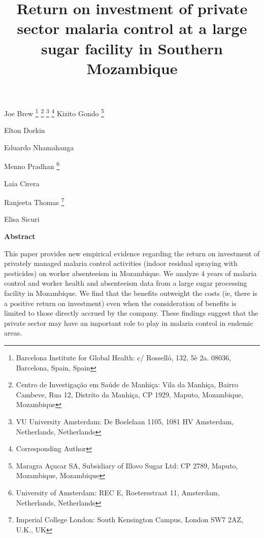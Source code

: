 \documentclass[]{article}
\title{Return on investment of private sector malaria control at a large sugar
facility in Southern Mozambique}
\author{}
\date{}
\let\rmarkdownfootnote\footnote%
\def\footnote{\protect\rmarkdownfootnote}
\newcommand{\footremember}[2]{%
    \footnote{#2}
    \newcounter{#1}
    \setcounter{#1}{\value{footnote}}%
}
\newcommand{\footrecall}[1]{%
    \footnotemark[\value{#1}]%
}
\begin{document}
\maketitle

\begin{center}
\begin{large}

Joe Brew\footremember{isglobal}{Barcelona Institute for Global Health: c/ Rosselló, 132, 5è 2a. 08036, Barcelona, Spain, Spain}\footremember{cism}{Centro de Investigação em Saúde de Manhiça: Vila da Manhiça, Bairro Cambeve, Rua 12, Distrito da Manhiça, CP 1929, Maputo, Mozambique, Mozambique}\footremember{vu}{VU University Amsterdam: De Boelelaan 1105, 1081 HV Amsterdam, Netherlands, Netherlands} \footnote{Corresponding Author}
Kizito Gondo\footremember{ma}{Maragra Açucar SA, Subsidiary of Illovo Sugar Ltd: CP 2789, Maputo, Mozambique, Mozambique}
Elton Dorkin\footrecall{ma}
Eduardo Nhamahanga\footrecall{ma}
Menno Pradhan\footrecall{vu}\footremember{uva}{University of Amsterdam: REC E, Roetersstraat 11, Amsterdam, Netherlands, Netherlands}
Laia Cirera\footrecall{isglobal}\footrecall{cism}
Ranjeeta Thomas\footremember{icl}{Imperial College London: South Kensington Campus, London SW7 2AZ, U.K., UK}
Elisa Sicuri\footrecall{isglobal}\footrecall{cism}\footrecall{icl}

\end{large}
\end{center}

\vspace{5mm}

\begin{center}
\textbf{Abstract}  
\end{center}

\vspace{5mm}

\begin{center}
\begin{changemargin}{3cm}{3cm} 

This paper provides new empirical evidence regarding the return on investment of privately managed malaria control activities (indoor residual spraying with pesticides) on worker absenteeism in Mozambique. We analyze 4 years of malaria control and worker health and absenteeism data from a large sugar processing facility in Mozambique. We find that the benefits outweight the costs (ie, there is a positive return on investment) even when the consideration of benefits is limited to those directly accrued by the company. These findings suggest that the private sector may have an important role to play in malaria control in endemic areas.

\end{changemargin}
\end{center}
\end{document}
